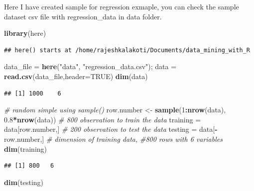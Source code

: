 \documentclass[a4paper,conference]{IEEEtran}
\newenvironment{Shaded}{\begin{snugshade}}{\end{snugshade}}
\newcommand{\AttributeTok}[1]{\textcolor[rgb]{0.13,0.29,0.53}{#1}}
\newcommand{\CommentTok}[1]{\textcolor[rgb]{0.56,0.35,0.01}{\textit{#1}}}
\newcommand{\ConstantTok}[1]{\textcolor[rgb]{0.56,0.35,0.01}{#1}}
\newcommand{\DecValTok}[1]{\textcolor[rgb]{0.00,0.00,0.81}{#1}}
\newcommand{\FloatTok}[1]{\textcolor[rgb]{0.00,0.00,0.81}{#1}}
\newcommand{\FunctionTok}[1]{\textcolor[rgb]{0.13,0.29,0.53}{\textbf{#1}}}
\newcommand{\NormalTok}[1]{#1}
\newcommand{\OtherTok}[1]{\textcolor[rgb]{0.56,0.35,0.01}{#1}}
\newcommand{\SpecialCharTok}[1]{\textcolor[rgb]{0.81,0.36,0.00}{\textbf{#1}}}
\newcommand{\StringTok}[1]{\textcolor[rgb]{0.31,0.60,0.02}{#1}}
\begin{document}
Here I have created sample for regression exmaple, you can check the
sample dataset csv file with regression\_data in data folder.

\begin{Shaded}
\begin{Highlighting}[]
\FunctionTok{library}\NormalTok{(here)}
\end{Highlighting}
\end{Shaded}

\begin{verbatim}
## here() starts at /home/rajeshkalakoti/Documents/data_mining_with_R
\end{verbatim}

\begin{Shaded}
\begin{Highlighting}[]
\NormalTok{data\_file }\OtherTok{=} \FunctionTok{here}\NormalTok{(}\StringTok{"data"}\NormalTok{, }
                 \StringTok{"regression\_data.csv"}\NormalTok{);}
\NormalTok{data }\OtherTok{=} \FunctionTok{read.csv}\NormalTok{(data\_file,}\AttributeTok{header=}\ConstantTok{TRUE}\NormalTok{)}
\FunctionTok{dim}\NormalTok{(data)}
\end{Highlighting}
\end{Shaded}

\begin{verbatim}
## [1] 1000    6
\end{verbatim}

\begin{Shaded}
\begin{Highlighting}[]
\CommentTok{\# random simple using sample()}
\NormalTok{row.number }\OtherTok{\textless{}{-}} \FunctionTok{sample}\NormalTok{(}\DecValTok{1}\SpecialCharTok{:}\FunctionTok{nrow}\NormalTok{(data),}
                     \FloatTok{0.8}\SpecialCharTok{*}\FunctionTok{nrow}\NormalTok{(data)) }
\CommentTok{\# 800 observation to train the data}
\NormalTok{training }\OtherTok{=}\NormalTok{ data[row.number,]}
 \CommentTok{\# 200 observation to test the data}
\NormalTok{testing }\OtherTok{=}\NormalTok{ data[}\SpecialCharTok{{-}}\NormalTok{row.number,]}
\CommentTok{\# dimension of training data,}
\CommentTok{\#800 rows with 6 variables}
\FunctionTok{dim}\NormalTok{(training)    }
\end{Highlighting}
\end{Shaded}

\begin{verbatim}
## [1] 800   6
\end{verbatim}

\begin{Shaded}
\begin{Highlighting}[]
\FunctionTok{dim}\NormalTok{(testing)  }
\end{Highlighting}
\end{Shaded}
\end{document}
